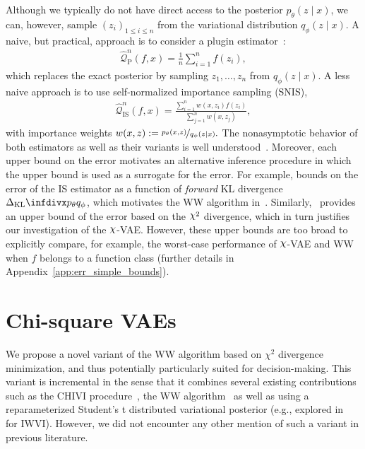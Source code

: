 Although we typically do not have direct access to the posterior $p_\theta(z \mid x)$, we can, however, sample $(z_i)_{1 \leq i \leq n}$ from the variational distribution $q_\phi(z \mid x)$.  A naive, but practical, approach is to consider a plugin estimator~\cite{Amini2018, Riesselman2018, Ding2018, Lopez292037}:
\begin{align}
\hat{\mathcal{Q}}^n_{\textrm{P}}(f, x) = \frac{1}{n}\sum_{i=1}^nf(z_i),
\end{align}
which replaces the exact posterior by sampling $z_1,\ldots,z_n$ from $q_\phi(z \mid x)$.  A less naive approach is to use
self-normalized importance sampling (SNIS),
\begin{align}
\hat{\mathcal{Q}}^n_{\textrm{IS}}(f, x) = 
    \frac{\sum_{i=1}^nw(x, z_i)f(z_i)}{\sum_{j=1}^nw(x, z_j)},
\end{align}
with importance weights
\(
    w(x, z) := \nicefrac{p_\theta(x, z)}{q_\phi(z\mid x)}. 
\)
The nonasymptotic behavior of both estimators as well as their variants is well understood~\cite{Chatterjee2018,Agapiou2017,Cortes2010}. Moreover, each upper bound on the error motivates an alternative inference procedure in which the upper bound is used as a surrogate for the error. For example, \cite{Chatterjee2018} bounds on the error of the IS estimator as a function of \textit{forward} KL divergence $\kl{p_\theta}{q_\phi}$, which motivates the WW algorithm in~\cite{le2018revisiting}. Similarly,~\cite{Agapiou2017} provides an upper bound of the error based on the $\rchi^2$ divergence, which in turn justifies our investigation of the $\rchi$-VAE. However, these upper bounds are too broad to explicitly compare, for example, the worst-case performance of $\rchi$-VAE and WW when $f$ belongs to a function class (further details in Appendix~\ref{app:err_simple_bounds}). 


\section{Chi-square VAEs}
\label{app:chi-vaes}
We propose a novel variant of the WW algorithm based on $\chi^2$ divergence minimization, and thus potentially particularly suited for decision-making. This variant is incremental in the sense that it combines several existing contributions such as the CHIVI procedure~\cite{NIPS2017_6866}, the WW algorithm~\cite{le2018revisiting} as well as using a reparameterized Student's t distributed variational posterior (e.g., explored in~\cite{NIPS2018_7699} for IWVI). However, we did not encounter any other mention of such a variant in previous literature. 

